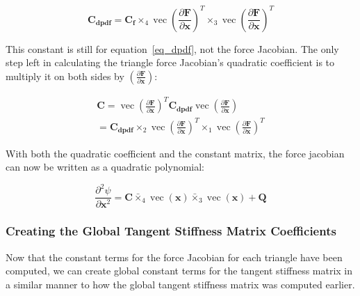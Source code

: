 \documentclass[twocolumn,10pt]{asme2ej}
\DeclareMathOperator{\vect}{vec}
\begin{document}
\begin{equation}
\bm{C_{dpdf}}  = \bm{C_f} \times_4 \vect \left( \frac{\partial \bm{F}}{\partial \bm{x}} \right)^T \times_3 \vect \left( \frac{\partial \bm{F}}{\partial \bm{x}}\right)^T
\end{equation}

This constant is still for equation~\ref{eq_dpdf}, not the force Jacobian. The only step left in calculating the triangle force Jacobian's quadratic coefficient is to multiply it on both sides by $\left(\frac{\partial \bm{F}}{\partial \bm{x}}\right)$:

\begin{multline}
\bm{C}  = \vect \left( \frac{\partial \bm{F}}{\partial \bm{x}} \right)^T \bm{C_{dpdf}} \vect \left( \frac{\partial \bm{F}}{\partial \bm{x}} \right)
\\ = \bm{C_{dpdf}} \times_2 \vect \left( \frac{\partial \bm{F}}{\partial \bm{x}} \right)^T \times_1 \vect \left( \frac{\partial \bm{F}}{\partial \bm{x}}\right)^T
\end{multline}

With both the quadratic coefficient and the constant matrix, the force jacobian can now be written as a quadratic polynomial:

\begin{equation}
\frac{\partial^2 \psi}{\partial \bm{x}^2} = \bm{C} \bar{\times}_4 \vect (\bm{x}) \bar{\times}_3 \vect (\bm{x}) + \bm{Q}
\label{eq_unreducedQuadratic}
\end{equation}

\subsubsection{Creating the Global Tangent Stiffness Matrix Coefficients}

Now that the constant terms for the force Jacobian for each triangle have been computed, we can create global constant terms for the tangent stiffness matrix in a similar manner to how the global tangent stiffness matrix was computed earlier.
\end{document}

